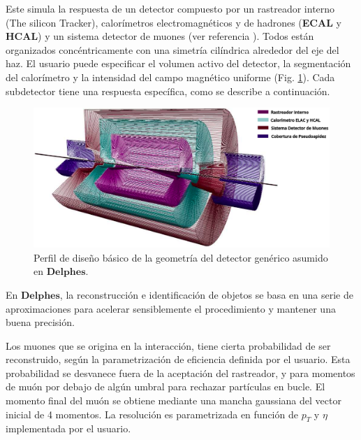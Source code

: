 Este simula la respuesta de un detector compuesto por un rastreador interno (The silicon Tracker), calorímetros electromagnéticos y de hadrones (\textbf{ECAL} y \textbf{HCAL}) y un sistema detector de muones (ver referencia \cite{de_favereau_Delphes_2014}). Todos están organizados concéntricamente con una simetría cilíndrica alrededor del eje del haz. El usuario puede especificar el volumen activo del detector, la segmentación del calorímetro y la intensidad del campo magnético uniforme (Fig. \ref{Delphes}). Cada subdetector tiene una respuesta específica, como se describe a continuación.

\begin{figure}[!t]
    \centering
    \includegraphics[width=.95\textwidth]{Analisis_y_Resultados/imagenes/delphes.png}
    \caption[Perfil de diseño básico de la geometría del detector genérico asumido en  \textbf{Delphes}.]{Perfil de diseño básico de la geometría del detector genérico asumido en  $\mathbf{Delphes}$.\footnotemark}
    \label{Delphes}
\end{figure}


En $\mathbf{Delphes}$, la reconstrucción e identificación de objetos se basa en una serie de aproximaciones para acelerar sensiblemente el procedimiento y mantener una buena precisión. 

Los muones que se origina en la interacción, tiene cierta probabilidad de ser reconstruido, según la parametrización de eficiencia definida por el usuario. Esta probabilidad se desvanece fuera de la aceptación del rastreador, y para momentos de muón por debajo de algún umbral para rechazar partículas en bucle. El momento final del muón se obtiene mediante una mancha gaussiana del vector inicial de 4 momentos. La resolución es parametrizada en función de $p_T$ y $\eta$ implementada por el usuario.

